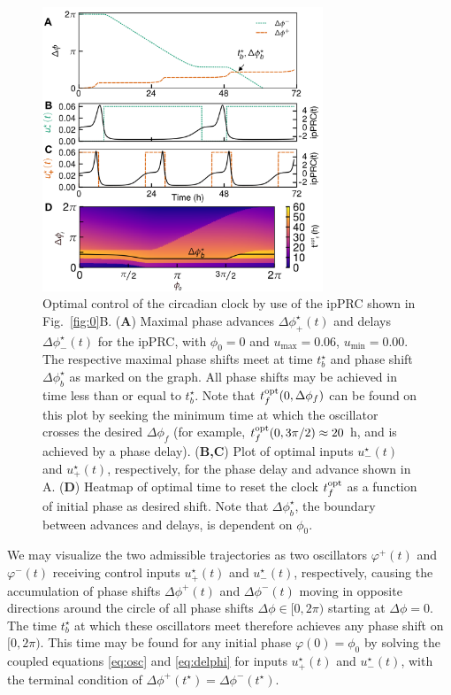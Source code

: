 \begin{figure}[p]
    \begin{center}
\includegraphics[width=8.4cm]{chap6/figures/figure_1.png}    %
\end{center}
\caption{\label{fig:optimal}Optimal control of the circadian clock by use of the ipPRC shown in Fig.~\ref{fig:0}B. (\textbf{A}) Maximal phase advances $\Delta\phi^\star_+(t)$ and delays $\Delta\phi^\star_-(t)$ for the ipPRC, with $\phi_0 = 0$ and $u_{\max} = 0.06$, $u_{\min} = 0.00$. The respective maximal phase shifts meet at time $t^\star_b$ and phase shift $\Delta\phi^\star_b$ as marked on the graph. All phase shifts may be achieved in time less than or equal to $t^\star_b$.
  Note that $t^{\rm opt}_f(0, \Delta\phi_f)$ can be found on this plot by seeking the minimum time at which the oscillator crosses the desired $\Delta\phi_f$ (for example, $t^{\rm opt}_f(0, 3\pi/2) \approx 20$ h, and is achieved by a phase delay).
  (\textbf{B,C}) Plot of optimal inputs $u^\star_-(t)$ and $u^\star_+(t)$, respectively, for the phase delay and advance shown in A.
  (\textbf{D}) Heatmap of optimal time to reset the clock $t^{\rm{opt}}_f$ as a function of initial phase as desired shift. Note that $\Delta\phi^\star_b$, the boundary between advances and delays, is dependent on $\phi_0$.}  %
\end{figure}

We may visualize the two admissible trajectories as two oscillators $\varphi^{+}(t)$ and $\varphi^{-}(t)$ receiving control inputs $u^\star_{+}(t)$ and $u^\star_{-}(t)$, respectively, causing the accumulation of phase shifts $\Delta\phi^{+}(t)$ and $\Delta\phi^{-}(t)$ moving in opposite directions around the circle of all phase shifts $\Delta\phi\in[0,2\pi)$ starting at $\Delta\phi=0$.
The time $t^\star_b$ at which these oscillators meet therefore achieves any phase shift on $[0,2\pi)$.
    This time may be found for any initial phase $\varphi(0)=\phi_0$ by solving the coupled equations \eqref{eq:osc} and \eqref{eq:delphi} for inputs $u^\star_{+}(t)$ and $u^\star_{-}(t)$, with the terminal condition of $\Delta\phi^{+}(t^\star)=\Delta\phi^{-}(t^\star)$.

